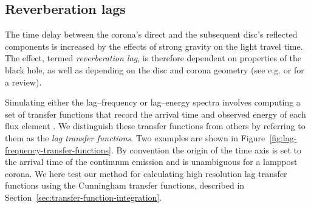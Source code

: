 \documentclass[fleqn,usenatbib]{mnras}
\begin{document}
\subsection{Reverberation lags}
\label{sec:lag-transfer-functions}

The time delay between the corona's direct and the subsequent disc's reflected
components is increased by the effects of strong gravity on the light travel
time. The effect, termed \emph{reverberation lag}, is therefore dependent on
properties of the black hole, as well as depending on the disc and corona
geometry (see e.g.  \cite{uttley_x-ray_2014} or
\cite{cackett_reverberation_2021} for a review).

Simulating either the lag--frequency or lag--energy spectra involves computing a
set of transfer functions that record the arrival time and observed energy of
each flux element \citep{reynolds_x-ray_1999}. We distinguish these transfer
functions from others by referring to them as the \textit{lag transfer
functions}. Two examples are shown in
Figure~\ref{fig:lag-frequency-transfer-functions}. By convention the origin of
the time axis is set to the arrival time of the continuum emission and is
unambiguous for a lamppost corona. We here test our method for calculating high
resolution lag transfer functions using the Cunningham transfer functions,
described in Section~\ref{sec:transfer-function-integration}.


\end{document}
